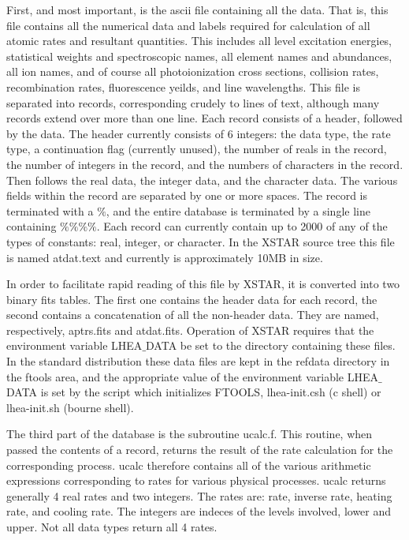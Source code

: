 First, and most important, is the ascii file containing all the data.  That is,
this file contains all the numerical data and labels required for 
calculation of all atomic rates and resultant quantities.
This includes all level excitation energies, statistical weights and 
spectroscopic names, all element names and abundances, all ion names,
and of course all photoionization cross sections, collision rates, 
recombination rates, fluorescence yeilds, and line wavelengths.
This file is separated into records, corresponding crudely to lines of text, 
although many records extend over more than one line.  
Each record consists of a header, followed by the data.  
The header currently consists of 6 integers:  the data type, the rate type, 
a continuation flag (currently unused), the number of reals in the 
record, the number of integers in the record, and the numbers of 
characters in the record.  Then follows the real data, the integer data, and 
the character data.  The various fields within the record 
are separated by one or more spaces.  The record is terminated with a $\%$, and the 
entire database is terminated by a single line containing $\%\%\%\%$.
Each record can currently contain up to 2000 of any of the types of constants:
real, integer, or character.  In the XSTAR source tree 
this file is named atdat.text and currently is approximately 10MB in size.

In order to facilitate rapid reading of this file by XSTAR, it is 
converted into two binary fits tables.  The first one contains the header data
for each record, the second contains a concatenation of all the non-header data.
They are named, respectively, aptrs.fits and atdat.fits.  Operation of 
XSTAR requires that the environment variable LHEA$\_$DATA be set to the 
directory containing these files.  In the standard distribution these data files
are kept in the refdata directory in the ftools area, and the appropriate 
value of the environment variable LHEA$\_$DATA is set by the script which 
initializes FTOOLS, lhea-init.csh (c shell) or lhea-init.sh (bourne shell).

The third part of the database is the subroutine ucalc.f.  This routine, when 
passed the contents of a record, returns the result of the rate 
calculation for the corresponding process.  ucalc therefore contains all 
of the various arithmetic expressions corresponding to rates for various 
physical processes.  ucalc returns generally 4 real rates and two integers.
The rates are: rate, inverse rate, heating rate, and cooling rate.  
The integers are indeces of the levels involved, lower and upper.
Not all data types return all 4 rates.

